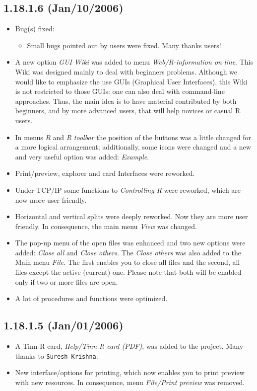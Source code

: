 \subsection*{1.18.1.6 (Jan/10/2006)}
\begin{itemize}
  \item Bug(s) fixed:
    \begin{itemize}
      \item Small bugs pointed out by users were fixed. Many thanks users!
    \end{itemize}
  \item A new option \textit{GUI Wiki} was added to menu
    \textit{Web/R-information on line}. This Wiki was designed mainly
    to deal with \RR{} beginners problems. Although we
    would like to emphasize the use \RR{} GUIs (Graphical User
    Interfaces), this Wiki is not restricted to those GUIs: one
    can also deal with command-line approaches. Thus, the main idea is
    to have material contributed by both beginners, and by
    more advanced \RR{} users, that will help novices or casual
    R users.
  \item In menus \textit{R} and \textit{R toolbar} the position of
    the buttons was a little changed for a more logical arrangement;
    additionally, some icons were changed and a new and very useful option
    was added: \textit{Example}.
  \item Print/preview, \RR{} explorer and \RR{} card Interfaces
    were reworked.
  \item Under TCP/IP some functions to \textit{Controlling R} were
    reworked, which are now more user friendly.
  \item Horizontal and vertical splits were deeply reworked.
    Now they are more user friendly. In consequence, the main menu \textit{View}
    was changed.
  \item The pop-up menu of the open files was enhanced and two new
    options were added: \textit{Close all} and \textit{Close others}.
    The \textit{Close others} was also added to the Main menu \textit{File}.
    The first enables you to close all files and the second, all files except
    the active (current) one. Please note that both will be enabled only if
    two or more files are open.
  \item A lot of procedures and functions were optimized.
\end{itemize}


\subsection*{1.18.1.5 (Jan/01/2006)}
\begin{itemize}
  \item A Tinn-R card, \textit{Help/Tinn-R card (PDF)}, was added
    to the project. Many thanks to \texttt{Suresh Krishna}.
  \item New interface/options for printing, which now enables you to
    print preview with new resources. In consequence, menu
    \textit{File/Print preview} was removed.
\end{itemize}

